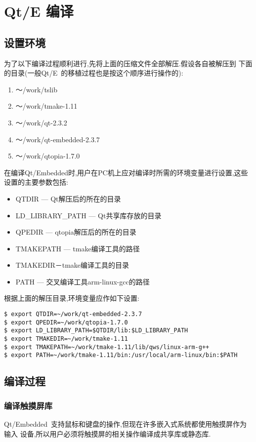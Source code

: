 \section{Qt/E 编译}
\subsection{设置环境}
	为了以下编译过程顺利进行,先将上面的压缩文件全部解压.假设各自被解压到
下面的目录(一般Qt/E~的移植过程也是按这个顺序进行操作的):
\begin{enumerate}\itemsep=-3pt
  \item ～/work/tslib
  \item ～/work/tmake-1.11
  \item ～/work/qt-2.3.2
  \item ～/work/qt-embedded-2.3.7
  \item ～/work/qtopia-1.7.0
\end{enumerate}

	在编译Qt/Embedded时,用户在PC机上应对编译时所需的环境变量进行设置,这些
设置的主要参数包括:
\begin{itemize}\itemsep=-3pt
  \item QTDIR --- Qt解压后的所在的目录
  \item LD\_LIBRARY\_PATH --- Qt共享库存放的目录
  \item QPEDIR --- qtopia解压后的所在的目录
  \item TMAKEPATH --- tmake编译工具的路径
  \item TMAKEDIR－tmake编译工具的目录
  \item PATH --- 交叉编译工具arm-linux-gcc的路径
\end{itemize}

	根据上面的解压目录,环境变量应作如下设置:

\begin{boxedminipage}{.9\textwidth}
\begin{verbatim}
$ export QTDIR=~/work/qt-embedded-2.3.7
$ export QPEDIR=~/work/qtopia-1.7.0
$ export LD_LIBRARY_PATH=$QTDIR/lib:$LD_LIBRARY_PATH
$ export TMAKEDIR=~/work/tmake-1.11
$ export TMAKEPATH=~/work/tmake-1.11/lib/qws/linux-arm-g++
$ export PATH=~/work/tmake-1.11/bin:/usr/local/arm-linux/bin:$PATH
\end{verbatim}
\end{boxedminipage}

\subsection{编译过程}
\subsubsection{编译触摸屏库}
	Qt/Embedded~支持鼠标和键盘的操作,但现在许多嵌入式系统都使用触摸屏作为输入
设备,所以用户必须将触摸屏的相关操作编译成共享库或静态库.

